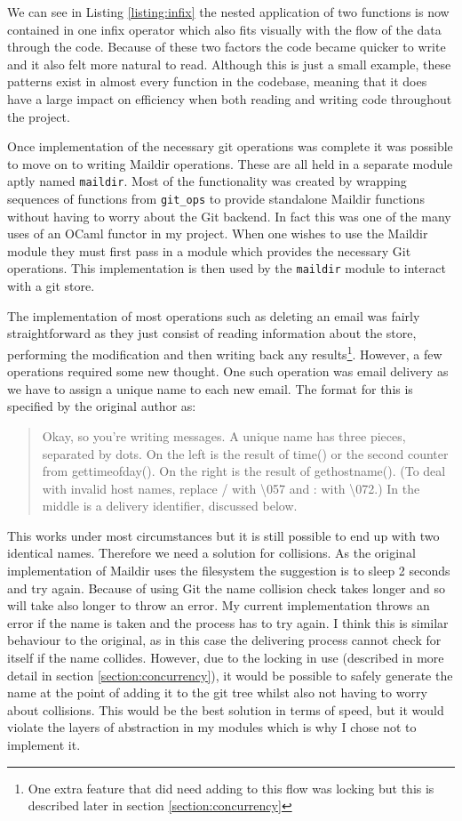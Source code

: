 We can see in Listing \ref{listing:infix} the nested application of two functions is now contained in one infix operator which also fits visually with the flow of the data through the code. Because of these two factors the code became quicker to write and it also felt more natural to read. Although this is just a small example, these patterns exist in almost every function in the codebase, meaning that it does have a large impact on efficiency when both reading and writing code throughout the project.

Once implementation of the necessary git operations was complete it was possible to move on to writing Maildir operations. These are all held in a separate module aptly named \texttt{maildir}. Most of the functionality was created by wrapping sequences of functions from \texttt{git\_ops} to provide standalone Maildir functions without having to worry about the Git backend. In fact this was one of the many uses of an OCaml functor in my project. When one wishes to use the Maildir module they must first pass in a module which provides the necessary Git operations. This implementation is then used by the \texttt{maildir} module to interact with a git store.

The implementation of most operations such as deleting an email was fairly straightforward as they just consist of reading information about the store, performing the modification and then writing back any results\footnote{One extra feature that did need adding to this flow was locking but this is described later in section \ref{section:concurrency}}. However, a few operations required some new thought. One such operation was email delivery as we have to assign a unique name to each new email. The format for this is specified by the original author\cite{bernstein2000maildir} as:
\begin{quote}
  Okay, so you're writing messages. A unique name has three pieces, separated by dots. On the left is the result of time() or the second counter from gettimeofday(). On the right is the result of gethostname(). (To deal with invalid host names, replace / with \textbackslash057 and : with \textbackslash072.) In the middle is a delivery identifier, discussed below.
\end{quote}
This works under most circumstances but it is still possible to end up with two identical names. Therefore we need a solution for collisions. As the original implementation of Maildir uses the filesystem the suggestion is to sleep 2 seconds and try again. Because of using Git the name collision check takes longer and so will take also longer to throw an error. My current implementation throws an error if the name is taken and the process has to try again. I think this is similar behaviour to the original, as in this case the delivering process cannot check for itself if the name collides. However, due to the locking in use (described in more detail in section \ref{section:concurrency}), it would be possible to safely generate the name at the point of adding it to the git tree whilst also not having to worry about collisions. This would be the best solution in terms of speed, but it would violate the layers of abstraction in my modules which is why I chose not to implement it.

